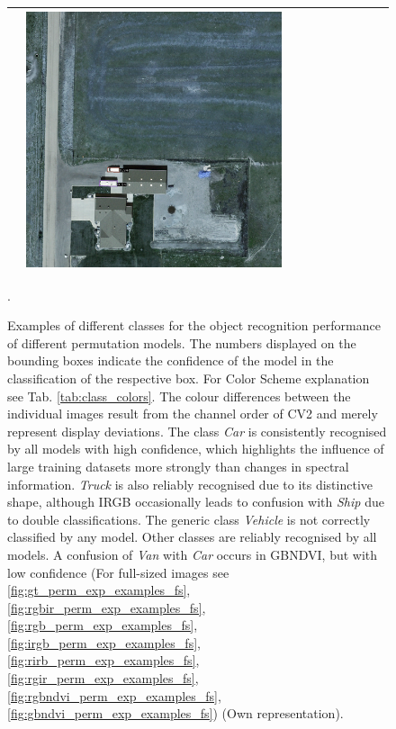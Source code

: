 \begin{figure}[H]
\begin{tabularx}{\textwidth}{c|*{9}{X}}
    & \includegraphics[trim={300pt 355pt 610pt 570pt},clip,width=\linewidth]{images/015Results/02perm_exp/comp_images/rgbndvi/198.png} \\ \hline



\end{tabularx}
\caption[Permutation Experiments: Examples of different classes for the object recognition performance]{Examples of different classes for the object recognition performance of different permutation models. The numbers displayed on the bounding boxes indicate the confidence of the model in the classification of the respective box. For Color Scheme explanation see Tab. \ref{tab:class_colors}. The colour differences between the individual images result from the channel order of \acrshort{CV2} and merely represent display deviations. The class \textit{Car} is consistently recognised by all models with high confidence, which highlights the influence of large training datasets more strongly than changes in spectral information. \textit{Truck} is also reliably recognised due to its distinctive shape, although IRGB occasionally leads to confusion with \textit{Ship} due to double classifications. The generic class \textit{Vehicle} is not correctly classified by any model. Other classes are reliably recognised by all models. A confusion of \textit{Van} with \textit{Car} occurs in \acrshort{GBNDVI}, but with low confidence (For full-sized images see \ref{fig:gt_perm_exp_examples_fs}, \ref{fig:rgbir_perm_exp_examples_fs}, \ref{fig:rgb_perm_exp_examples_fs}, \ref{fig:irgb_perm_exp_examples_fs}, \ref{fig:rirb_perm_exp_examples_fs}, \ref{fig:rgir_perm_exp_examples_fs}, \ref{fig:rgbndvi_perm_exp_examples_fs}, \ref{fig:gbndvi_perm_exp_examples_fs}) (Own representation).}
\label{fig:perm_exp_example_pics}.
\end{figure}